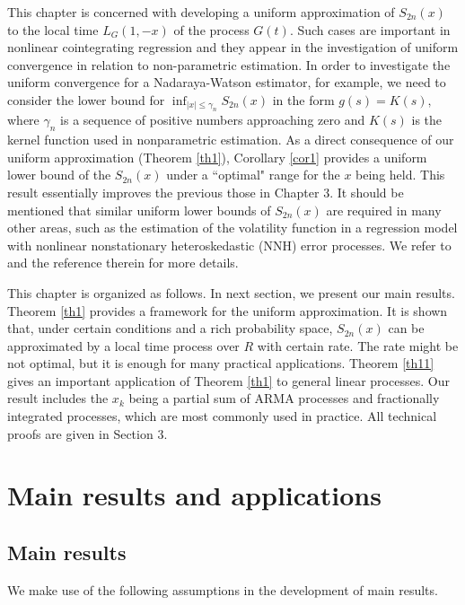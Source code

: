 This chapter is concerned with developing a uniform approximation of $S_{2n}(x)$ to the local time $L_{G}(1,-x)$ of the process $G(t)$. Such cases are important in nonlinear cointegrating regression and they appear in the investigation  of   uniform convergence in relation to  non-parametric estimation.  In order to investigate the uniform convergence for a Nadaraya-Watson estimator, for example, we need to consider the lower bound for $\inf _{|x|\le \gamma_n}S_{2n}(x)$ in
the form $g( s) =K( s),$ where $\gamma_n$ is a sequence of positive numbers approaching zero and $K(s) $ is the kernel function used in nonparametric estimation. As  a direct consequence of our uniform approximation  (Theorem \ref{th1}), Corollary \ref{cor1} provides a uniform lower  bound of the $S_{2n}(x)$ under  a ``optimal" range for the $x$ being held. This result essentially improves the previous those in Chapter 3. It should be mentioned that similar  uniform lower bounds of $S_{2n}(x)$  are required in many other areas, such as  the estimation of the volatility function in a regression  model with nonlinear nonstationary heteroskedastic (NNH) error processes. We refer to \cite{wangwang2012} and the reference therein  for more details.

This chapter is organized as follows.  In next section, we present our
main results. Theorem \ref {th1} provides a framework for the uniform approximation. It is shown that, under certain conditions and a rich probability space, $S_{2n}(x)$ can be approximated by a local time process over $R$ with certain rate. The rate might be not optimal, but it is enough for many practical applications.
Theorem \ref {th11} gives an important application of
Theorem \ref {th1} to general linear processes. Our result includes
 the $x_k$ being a partial sum of ARMA processes and fractionally integrated processes,
 which are most commonly used in practice. All technical proofs are given in Section 3.



\section{Main results and applications}
\subsection{Main results}

We make use of the following assumptions in the development of main results.

